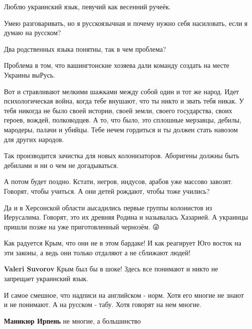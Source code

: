
Люблю украинский язык, певучий как весенний ручеёк.

Умею разговаривать, но я русскоязычная и почему нужно себя насиловать, если я
думаю на русском?

Два родственных языка понятны, так в чем проблема?


Проблема в том, что вашингтонские хозяева дали команду создать на месте Украины выРусь.

Вот и стравливают мелкими шажками между собой один и тот же народ. Идет
психологическая война, когда тебе внушают, что ты никто и звать тебя никак. У
тебя никогда не было своей истории, своей земли, своего государства, своих
героев, вождей, полководцев. А то, что было, это сплошные мерзавцы, дебилы,
мародеры, палачи и убийцы. Тебе нечем гордиться и ты должен стать навозом для
других народов.

Так производится зачистка для новых колонизаторов. Аборигены должны быть
дебилами и ни о чем не догадываться.

А потом будет поздно. Кстати, негров, индусов, арабов уже массово завозят.
Говорят, чтобы учиться. А они детей рождают, чтобы тоже учились?

Да и в Херсонской области аысадились первые группы колонистов из Иерусалима.
Говорят, это их древняя Родина и называлась Хазарией. А украинцы пришли позже
на уже приготовленный чернозём. 😜


Как радуется Крым, что они не в этом бардаке! И как реагирует Юго восток на эти
законы, а ведь они только отдаляют а не сближают людей!


\textbf{Valeri Suvorov} Крым был бы в шоке! Здесь все понимают и никто не
запрещает украинский язык.


И самое смешное, что надписи на английском - норм. Хотя его многие не знают и
не понимают. А на русском - табу. Хотя говорят на нем многие.

\textbf{Маникюр Ирпень} не многие, а большинство

